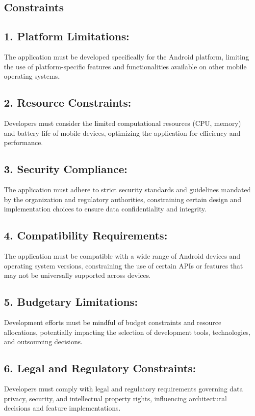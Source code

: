 \documentclass[]{article}
\begin{document}
\subsection{Constraints}
\label{sub:constraints}
\subsection*{1. Platform Limitations:}
The application must be developed specifically for the Android platform, limiting the use of platform-specific features and functionalities available on other mobile operating systems.

\subsection*{2. Resource Constraints:}
Developers must consider the limited computational resources (CPU, memory) and battery life of mobile devices, optimizing the application for efficiency and performance.

\subsection*{3. Security Compliance:}
The application must adhere to strict security standards and guidelines mandated by the organization and regulatory authorities, constraining certain design and implementation choices to ensure data confidentiality and integrity.

\subsection*{4. Compatibility Requirements:}
The application must be compatible with a wide range of Android devices and operating system versions, constraining the use of certain APIs or features that may not be universally supported across devices.

\subsection*{5. Budgetary Limitations:}
Development efforts must be mindful of budget constraints and resource allocations, potentially impacting the selection of development tools, technologies, and outsourcing decisions.

\subsection*{6. Legal and Regulatory Constraints:}
Developers must comply with legal and regulatory requirements governing data privacy, security, and intellectual property rights, influencing architectural decisions and feature implementations.
\end{document}

